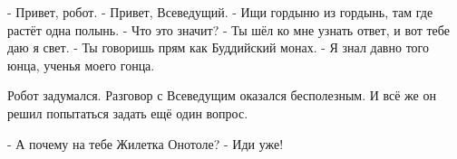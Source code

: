- Привет, робот.
- Привет, Всеведущий.
- Ищи гордыню из гордынь, там где растёт одна полынь.
- Что это значит?
- Ты шёл ко мне узнать ответ, и вот тебе даю я свет.
- Ты говоришь прям как Буддийский монах.
- Я знал давно того юнца, ученья моего гонца.

Робот задумался. Разговор с Всеведущим оказался бесполезным. И всё же он решил попытаться задать ещё один вопрос.

- А почему на тебе Жилетка Онотоле?
- Иди уже!